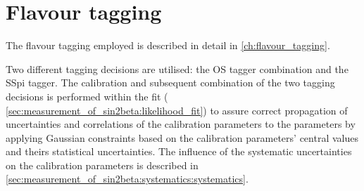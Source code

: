 
\section{Flavour tagging}
\label{sec:measurement_of_sin2beta:flavour_tagging}

The flavour tagging employed is described in detail in
\cref{ch:flavour_tagging}.

Two different tagging decisions are utilised: the \acf{OS} tagger combination
and the \acf{SSpi} tagger. The calibration and subsequent combination of the two
tagging decisions is performed within the fit (\cf
\cref{sec:measurement_of_sin2beta:likelihood_fit}) to assure correct propagation
of uncertainties and correlations of the calibration parameters to the \CP
parameters by applying Gaussian constraints based on the calibration parameters'
central values and theirs statistical uncertainties. The influence of the
systematic uncertainties on the calibration parameters is described in
\cref{sec:measurement_of_sin2beta:systematics:systematics}.

